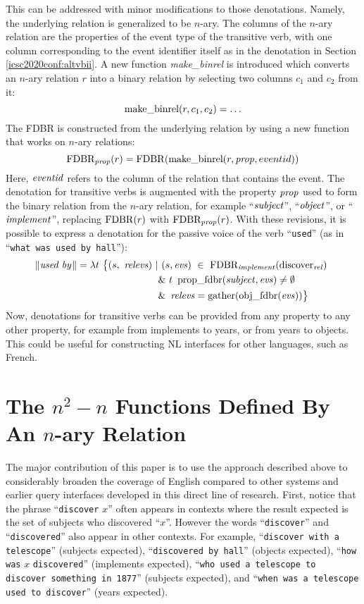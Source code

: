\documentclass[../main.tex]{subfiles}
\begin{document}
\begin{refsection}
This can be addressed with minor modifications to those denotations. Namely, the underlying relation is generalized to be $n$-ary. The columns of the $n$-ary relation are the properties of the event type of the transitive verb, with one column corresponding to the event identifier itself as in the denotation in Section \ref{icsc2020conf:altvbii}. A new function {\em make\_binrel} is introduced which converts an $n$-ary relation $r$ into a binary relation by selecting two columns $c_1$ and $c_2$ from it:
\[
\text{make\_binrel}({r}, {c_1}, {c_2}) = \ldots
\]
The FDBR is constructed from the underlying relation by using a new function that works on $n$-ary relations:
\[\text{FDBR}_{\operatorname{\mathit{prop}}}(r) = \operatorname{FDBR}({\text{make\_binrel}({r}, {\operatorname{\mathit{prop}}}, {eventid})})\]
Here, $\operatorname{\mathit{eventid}}$ refers to the column of the relation that contains the event.
The denotation for transitive verbs is augmented with the property $\operatorname{\mathit{prop}}$ used to form the binary relation from the $n$-ary relation, for example ``$\operatorname{\mathit{subject}}$'', ``$\operatorname{\mathit{object}}$'', or ``$\operatorname{\mathit{implement}}$'', replacing $\operatorname{FDBR}({r})$ with $\text{FDBR}_{\operatorname{\mathit{prop}}}(r)$.  With these revisions, it is possible to express a denotation for the passive voice of the verb ``\texttt{used}'' (as in ``\texttt{what was used by hall}''):
\begin{equation*}
	\begin{split}
		\meaningof{used by} = \lambda t\ \big\{ (s,\ \opit{relevs})\ |&\ (s, \evs)\ \in\ \dmathrm{FDBR}_{\opit{implement}}(\relation{\discover})\  \\
		& \&\ t\ \propfdbr{\opit{subject}}{\evs} \neq \emptyset \\
		& \&\ \opit{relevs} = \gatherevs{\objfdbr{\evs}} \big\}
	\end{split}
\end{equation*}
Now, denotations for transitive verbs can be provided from any property to any other property, for example from implements to years, or from years to objects. This could be useful for constructing NL interfaces for other languages, such as French.

\section{The $n^2-n$ Functions Defined By An $n$-ary Relation}

The major contribution of this paper is to use the approach described above to considerably broaden the coverage of English compared to other systems and earlier \cite{graphmqslide,peelar2016accommodating} query interfaces developed in this direct line of research.
First, notice that the phrase ``\texttt{discover} $x$'' often appears in contexts where the result expected is
the set of subjects who discovered ``$x$''. However the words ``\texttt{discover}'' and ``\texttt{discovered}''
also appear in other contexts. For example, ``\texttt{discover with a telescope}'' (subjects expected), ``\texttt{discovered by
hall}'' (objects expected), ``\texttt{how was} $x$ \texttt{discovered}''  (implements expected), ``\texttt{who used a telescope
to discover something in 1877}'' (subjects expected), and ``\texttt{when was a telescope used to discover}'' (years
expected).


\end{refsection}
\end{document}
